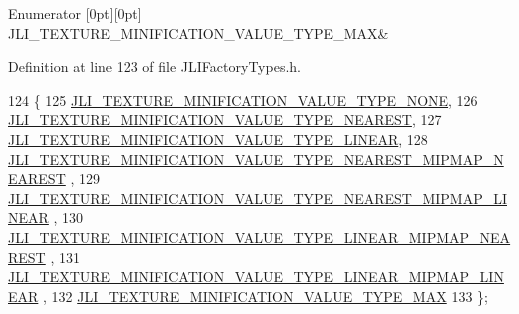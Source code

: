 \begin{DoxyEnumFields}{Enumerator}
[0pt][0pt]{}\mbox{\label{namespacenjli_a980b62f11da3b7143a525012cb512baca839e6bf7ffee928b16c3aa23e5634441}} 
J\+L\+I\+\_\+\+T\+E\+X\+T\+U\+R\+E\+\_\+\+M\+I\+N\+I\+F\+I\+C\+A\+T\+I\+O\+N\+\_\+\+V\+A\+L\+U\+E\+\_\+\+T\+Y\+P\+E\+\_\+\+M\+AX&\\
\hline

\end{DoxyEnumFields}


Definition at line 123 of file J\+L\+I\+Factory\+Types.\+h.


\begin{DoxyCode}
124   \{
125     \mbox{\hyperlink{namespacenjli_a980b62f11da3b7143a525012cb512bacab1e637b05fcb08d5e58eae389fc2ec1c}{JLI\_TEXTURE\_MINIFICATION\_VALUE\_TYPE\_NONE}},
126     \mbox{\hyperlink{namespacenjli_a980b62f11da3b7143a525012cb512baca0e5f9c0de2d17ebab337536717a866ee}{JLI\_TEXTURE\_MINIFICATION\_VALUE\_TYPE\_NEAREST}},
127     \mbox{\hyperlink{namespacenjli_a980b62f11da3b7143a525012cb512bacabcef37117765fdc950d66b500660e7d9}{JLI\_TEXTURE\_MINIFICATION\_VALUE\_TYPE\_LINEAR}},
128     \mbox{\hyperlink{namespacenjli_a980b62f11da3b7143a525012cb512baca735e4154e8e5c3b7b6ed4fce8415dfd2}{JLI\_TEXTURE\_MINIFICATION\_VALUE\_TYPE\_NEAREST\_MIPMAP\_NEAREST}}
      ,
129     \mbox{\hyperlink{namespacenjli_a980b62f11da3b7143a525012cb512baca54fe6ca3122ab5e3bbb4a9304c50d347}{JLI\_TEXTURE\_MINIFICATION\_VALUE\_TYPE\_NEAREST\_MIPMAP\_LINEAR}}
      ,
130     \mbox{\hyperlink{namespacenjli_a980b62f11da3b7143a525012cb512baca0a51cd436376fc2d072017822a1588ac}{JLI\_TEXTURE\_MINIFICATION\_VALUE\_TYPE\_LINEAR\_MIPMAP\_NEAREST}}
      ,
131     \mbox{\hyperlink{namespacenjli_a980b62f11da3b7143a525012cb512baca39d8ea38f0a6031c6aee61dbfef742b3}{JLI\_TEXTURE\_MINIFICATION\_VALUE\_TYPE\_LINEAR\_MIPMAP\_LINEAR}}
      ,
132     \mbox{\hyperlink{namespacenjli_a980b62f11da3b7143a525012cb512baca839e6bf7ffee928b16c3aa23e5634441}{JLI\_TEXTURE\_MINIFICATION\_VALUE\_TYPE\_MAX}}
133   \};
\end{DoxyCode}
\mbox{\label{namespacenjli_a90fea397e2267cd1b01c163319db48fb}} 
